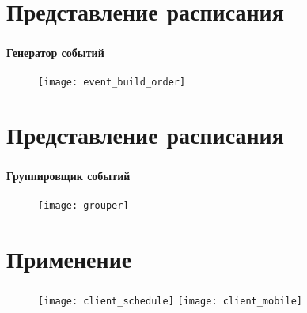 
\section{Представление расписания}

\begin{frame}
\frametitle{\insertsection}
\framesubtitle{Генератор событий}

\vspace{1cm}

\begin{figure}
    \center
    \texttt{[image: event\_build\_order]}
\end{figure}
\end{frame}


\section{Представление расписания}

\begin{frame}
\frametitle{\insertsection}
\framesubtitle{Группировщик событий}

\vspace{1cm}

\begin{figure}
    \center
    \texttt{[image: grouper]}
\end{figure}
\end{frame}


\section{Применение}

\begin{frame}
\frametitle{\insertsection}

\begin{figure}[!htb]
        \texttt{[image: client\_schedule]}
    \endminipage\hfill
        \texttt{[image: client\_mobile]}
    \endminipage
\end{figure}

\end{frame}

